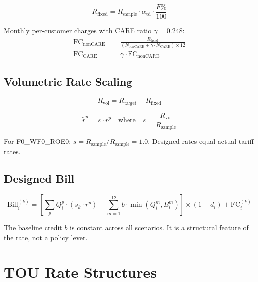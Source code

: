 \documentclass[9pt]{article}
\begin{document}
\begin{equation}
R_{\text{fixed}} = R_{\text{sample}} \cdot \alpha_{\text{td}} \cdot \frac{F\%}{100}
\end{equation}

Monthly per-customer charges with CARE ratio $\gamma = 0.248$:
\begin{align}
\text{FC}_{\text{nonCARE}} &= \frac{R_{\text{fixed}}}{(N_{\text{nonCARE}} + \gamma \cdot N_{\text{CARE}}) \times 12} \\
\text{FC}_{\text{CARE}} &= \gamma \cdot \text{FC}_{\text{nonCARE}}
\end{align}

\subsection{Volumetric Rate Scaling}

\begin{equation}
R_{\text{vol}} = R_{\text{target}} - R_{\text{fixed}}
\end{equation}

\begin{equation}
\tilde{r}^p = s \cdot r^p \quad \text{where} \quad s = \frac{R_{\text{vol}}}{R_{\text{sample}}}
\end{equation}

For F0\_WF0\_ROE0: $s = R_{\text{sample}} / R_{\text{sample}} = 1.0$. Designed rates equal actual tariff rates.

\subsection{Designed Bill}

\begin{equation}
\text{Bill}_i^{(k)} = \left[ \sum_p Q_i^p \cdot (s_k \cdot r^p) - \sum_{m=1}^{12} b \cdot \min(Q_i^m, B_i^m) \right] \times (1 - d_i) + \text{FC}_i^{(k)}
\end{equation}

The baseline credit $b$ is constant across all scenarios. It is a structural feature of the rate, not a policy lever.

\section{TOU Rate Structures}
\label{sec:tou}
\end{document}
